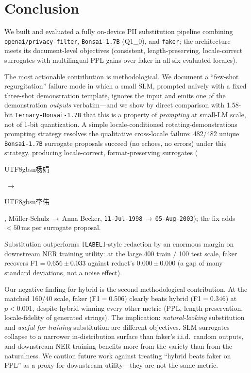 \documentclass[11pt]{article}
\newcommand{\code}[1]{\texttt{#1}}
\newcommand{\arrowto}{\ensuremath{\rightarrow}}
\newcommand{\openaipf}{\code{openai/privacy-filter}}
\newcommand{\bonsai}{\code{Bonsai-1.7B}}
\newcommand{\ternary}{\code{Ternary-Bonsai-1.7B}}
\newcommand{\faker}{\code{faker}}
\newcommand{\cjk}[1]{\begin{CJK*}{UTF8}{gbsn}#1\end{CJK*}}
\begin{document}
\section{Conclusion}
\label{sec:conclusion}

We built and evaluated a fully on-device PII substitution pipeline
combining \openaipf{}, \bonsai{} (Q1\_0), and \faker{}; the
architecture meets its document-level objectives (consistent,
length-preserving, locale-correct surrogates with multilingual-PPL
gains over faker in all six evaluated locales).

The most actionable contribution is methodological. We document a
``few-shot regurgitation'' failure mode in which a small SLM, prompted
naively with a fixed three-shot demonstration template, ignores the
input and emits one of the demonstration \emph{outputs} verbatim---and
we show by direct comparison with 1.58-bit \ternary{} that this is a
property of \emph{prompting} at small-LM scale, not of 1-bit
quantization. A simple locale-conditioned rotating-demonstrations
prompting strategy resolves the qualitative cross-locale failure:
482/482 unique \bonsai{} surrogate proposals succeed (no echoes, no
errors) under this strategy, producing locale-correct,
format-preserving surrogates
(\cjk{杨娟}\,\arrowto\,\cjk{李伟}, M\"uller-Schulz\,\arrowto\,Anna
Becker, \code{11-Jul-1998}\,\arrowto\,\code{05-Aug-2003}); the fix
adds $<50$\,ms per surrogate proposal.

Substitution outperforms \code{[LABEL]}-style redaction by an enormous
margin on downstream NER training utility: at the large 400 train /
100 test scale, faker recovers F1$=$0.656\,$\pm$\,0.033 against
redact's 0.000\,$\pm$\,0.000 (a gap of many standard deviations, not
a noise effect).

Our negative finding for hybrid is the second methodological
contribution. At the matched 160/40 scale, faker (F1$=$0.506) clearly
beats hybrid (F1$=$0.346) at $p<0.001$, despite hybrid winning every
other metric (PPL, length preservation, locale-fidelity of generated
strings). The implication: \emph{natural-looking} substitution and
\emph{useful-for-training} substitution are different objectives. SLM
surrogates collapse to a narrower in-distribution surface than faker's
i.i.d.\ random outputs, and downstream NER training benefits more from
the variety than from the naturalness. We caution future work against
treating ``hybrid beats faker on PPL'' as a proxy for downstream
utility---they are not the same metric.
\end{document}
